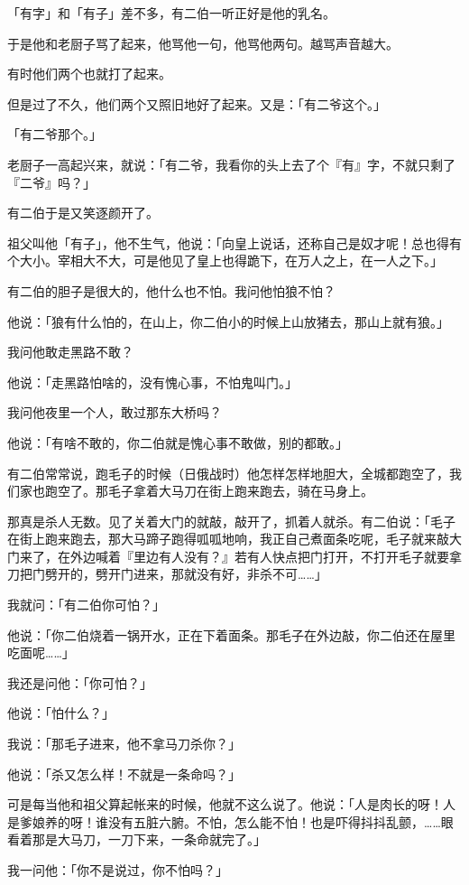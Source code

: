 \documentclass[UTF8]{ctexart}
\begin{document}
「有字」和「有子」差不多，有二伯一听正好是他的乳名。

于是他和老厨子骂了起来，他骂他一句，他骂他两句。越骂声音越大。

有时他们两个也就打了起来。

但是过了不久，他们两个又照旧地好了起来。又是：「有二爷这个。」

「有二爷那个。」

老厨子一高起兴来，就说：「有二爷，我看你的头上去了个『有』字，不就只剩了『二爷』吗？」

有二伯于是又笑逐颜开了。

祖父叫他「有子」，他不生气，他说：「向皇上说话，还称自己是奴才呢！总也得有个大小。宰相大不大，可是他见了皇上也得跪下，在万人之上，在一人之下。」

有二伯的胆子是很大的，他什么也不怕。我问他怕狼不怕？

他说：「狼有什么怕的，在山上，你二伯小的时候上山放猪去，那山上就有狼。」

我问他敢走黑路不敢？

他说：「走黑路怕啥的，没有愧心事，不怕鬼叫门。」

我问他夜里一个人，敢过那东大桥吗？

他说：「有啥不敢的，你二伯就是愧心事不敢做，别的都敢。」

有二伯常常说，跑毛子的时候（日俄战时）他怎样怎样地胆大，全城都跑空了，我们家也跑空了。那毛子拿着大马刀在街上跑来跑去，骑在马身上。

那真是杀人无数。见了关着大门的就敲，敲开了，抓着人就杀。有二伯说：「毛子在街上跑来跑去，那大马蹄子跑得呱呱地响，我正自己煮面条吃呢，毛子就来敲大门来了，在外边喊着『里边有人没有？』若有人快点把门打开，不打开毛子就要拿刀把门劈开的，劈开门进来，那就没有好，非杀不可……」

我就问：「有二伯你可怕？」

他说：「你二伯烧着一锅开水，正在下着面条。那毛子在外边敲，你二伯还在屋里吃面呢……」

我还是问他：「你可怕？」

他说：「怕什么？」

我说：「那毛子进来，他不拿马刀杀你？」

他说：「杀又怎么样！不就是一条命吗？」

可是每当他和祖父算起帐来的时候，他就不这么说了。他说：「人是肉长的呀！人是爹娘养的呀！谁没有五脏六腑。不怕，怎么能不怕！也是吓得抖抖乱颤，……眼看着那是大马刀，一刀下来，一条命就完了。」

我一问他：「你不是说过，你不怕吗？」
\end{document}
